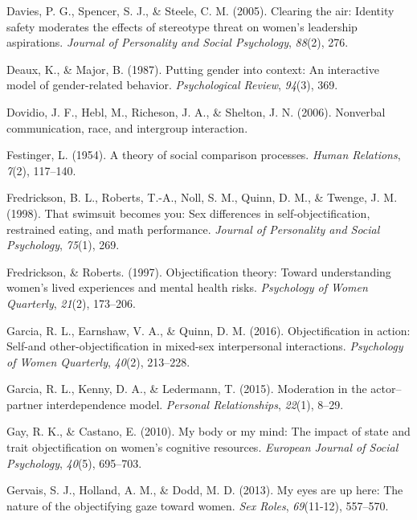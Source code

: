 \documentclass[man]{apa6}
\begin{document}
\hypertarget{ref-davies2005clearing}{}
Davies, P. G., Spencer, S. J., \& Steele, C. M. (2005). Clearing the
air: Identity safety moderates the effects of stereotype threat on
women's leadership aspirations. \emph{Journal of Personality and Social
Psychology}, \emph{88}(2), 276.

\hypertarget{ref-deaux1987putting}{}
Deaux, K., \& Major, B. (1987). Putting gender into context: An
interactive model of gender-related behavior. \emph{Psychological
Review}, \emph{94}(3), 369.

\hypertarget{ref-dovidio2006nonverbal}{}
Dovidio, J. F., Hebl, M., Richeson, J. A., \& Shelton, J. N. (2006).
Nonverbal communication, race, and intergroup interaction.

\hypertarget{ref-festinger1954theory}{}
Festinger, L. (1954). A theory of social comparison processes.
\emph{Human Relations}, \emph{7}(2), 117--140.

\hypertarget{ref-fredrickson1998swimsuit}{}
Fredrickson, B. L., Roberts, T.-A., Noll, S. M., Quinn, D. M., \&
Twenge, J. M. (1998). That swimsuit becomes you: Sex differences in
self-objectification, restrained eating, and math performance.
\emph{Journal of Personality and Social Psychology}, \emph{75}(1), 269.

\hypertarget{ref-robertsfredrickson}{}
Fredrickson, \& Roberts. (1997). Objectification theory: Toward
understanding women's lived experiences and mental health risks.
\emph{Psychology of Women Quarterly}, \emph{21}(2), 173--206.

\hypertarget{ref-garcia2016objectification}{}
Garcia, R. L., Earnshaw, V. A., \& Quinn, D. M. (2016). Objectification
in action: Self-and other-objectification in mixed-sex interpersonal
interactions. \emph{Psychology of Women Quarterly}, \emph{40}(2),
213--228.

\hypertarget{ref-garcia2015moderation}{}
Garcia, R. L., Kenny, D. A., \& Ledermann, T. (2015). Moderation in the
actor--partner interdependence model. \emph{Personal Relationships},
\emph{22}(1), 8--29.

\hypertarget{ref-gay2010my}{}
Gay, R. K., \& Castano, E. (2010). My body or my mind: The impact of
state and trait objectification on women's cognitive resources.
\emph{European Journal of Social Psychology}, \emph{40}(5), 695--703.

\hypertarget{ref-gervais2013my}{}
Gervais, S. J., Holland, A. M., \& Dodd, M. D. (2013). My eyes are up
here: The nature of the objectifying gaze toward women. \emph{Sex
Roles}, \emph{69}(11-12), 557--570.
\end{document}
